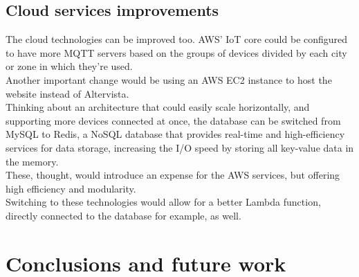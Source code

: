 \documentclass[conference]{IEEEtran}
\begin{document}
	\subsection{Cloud services improvements}
		The cloud technologies can be improved too.
		AWS' IoT core could be configured to have more MQTT servers based on the groups of devices divided by each city or zone in which they're used.\\
		Another important change would be using an AWS EC2 instance to host the website instead of Altervista.\\
		Thinking about an architecture that could easily scale horizontally, and supporting more devices connected at once, the database can be switched from MySQL to Redis,  a NoSQL database that provides real-time and high-efficiency services for data storage, increasing the I/O speed by storing all key-value data in the memory\cite{redis}.\\
		These, thought, would introduce an expense for the AWS services, but offering high efficiency and modularity.\\
		Switching to these technologies would allow for a better Lambda function, directly connected to the database for example, as well.
		
\section{Conclusions and future work}\label{conclusions}
\end{document}

